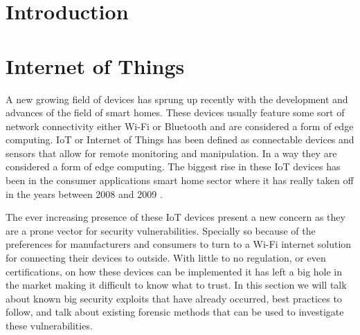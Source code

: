 \documentclass[acmlarge]{acmart}
\begin{document}



\maketitle

\section{Introduction}
\lipsum[1]

\section{Internet of Things}

A new growing field of devices has sprung up recently with the development and advances of the field of smart homes. These devices usually feature some sort of network connectivity either Wi-Fi or Bluetooth and are considered a form of edge computing. IoT or Internet of Things has been defined as connectable devices and sensors that allow for remote monitoring and manipulation. In a way they are considered a form of edge computing. The biggest rise in these IoT devices has been in the consumer applications smart home sector where it has really taken off in the years between 2008 and 2009 \cite{evans_iot_2011}.

The ever increasing presence of these IoT devices present a new concern as they are a prone vector for security vulnerabilities. Specially so because of the preferences for manufacturers and consumers to turn to a Wi-Fi internet solution for connecting their devices to outside. With little to no regulation, or even certifications, on how these devices can be implemented it has left a big hole in the market making it difficult to know what to trust. 
In this section we will talk about known big security exploits that have already occurred, best practices to follow, and talk about existing forensic methods that can be used to investigate these vulnerabilities.
\end{document}
